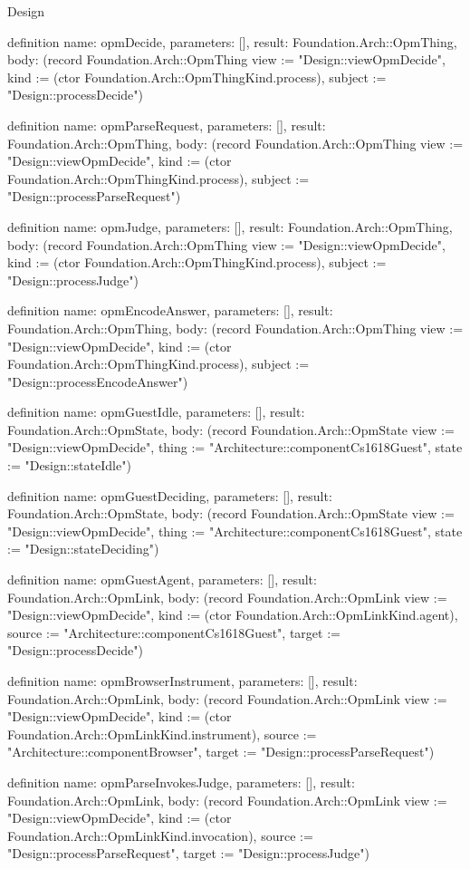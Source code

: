 \begin{lexlean}{Design}
\begin{semanticmodule}
definition{
  name: opmDecide,
  parameters: [],
  result: Foundation.Arch::OpmThing,
  body: (record Foundation.Arch::OpmThing {view := "Design::viewOpmDecide", kind := (ctor Foundation.Arch::OpmThingKind.process), subject := "Design::processDecide"})
}

definition{
  name: opmParseRequest,
  parameters: [],
  result: Foundation.Arch::OpmThing,
  body: (record Foundation.Arch::OpmThing {view := "Design::viewOpmDecide", kind := (ctor Foundation.Arch::OpmThingKind.process), subject := "Design::processParseRequest"})
}

definition{
  name: opmJudge,
  parameters: [],
  result: Foundation.Arch::OpmThing,
  body: (record Foundation.Arch::OpmThing {view := "Design::viewOpmDecide", kind := (ctor Foundation.Arch::OpmThingKind.process), subject := "Design::processJudge"})
}

definition{
  name: opmEncodeAnswer,
  parameters: [],
  result: Foundation.Arch::OpmThing,
  body: (record Foundation.Arch::OpmThing {view := "Design::viewOpmDecide", kind := (ctor Foundation.Arch::OpmThingKind.process), subject := "Design::processEncodeAnswer"})
}

definition{
  name: opmGuestIdle,
  parameters: [],
  result: Foundation.Arch::OpmState,
  body: (record Foundation.Arch::OpmState {view := "Design::viewOpmDecide", thing := "Architecture::componentCs1618Guest", state := "Design::stateIdle"})
}

definition{
  name: opmGuestDeciding,
  parameters: [],
  result: Foundation.Arch::OpmState,
  body: (record Foundation.Arch::OpmState {view := "Design::viewOpmDecide", thing := "Architecture::componentCs1618Guest", state := "Design::stateDeciding"})
}

definition{
  name: opmGuestAgent,
  parameters: [],
  result: Foundation.Arch::OpmLink,
  body: (record Foundation.Arch::OpmLink {view := "Design::viewOpmDecide", kind := (ctor Foundation.Arch::OpmLinkKind.agent), source := "Architecture::componentCs1618Guest", target := "Design::processDecide"})
}

definition{
  name: opmBrowserInstrument,
  parameters: [],
  result: Foundation.Arch::OpmLink,
  body: (record Foundation.Arch::OpmLink {view := "Design::viewOpmDecide", kind := (ctor Foundation.Arch::OpmLinkKind.instrument), source := "Architecture::componentBrowser", target := "Design::processParseRequest"})
}

definition{
  name: opmParseInvokesJudge,
  parameters: [],
  result: Foundation.Arch::OpmLink,
  body: (record Foundation.Arch::OpmLink {view := "Design::viewOpmDecide", kind := (ctor Foundation.Arch::OpmLinkKind.invocation), source := "Design::processParseRequest", target := "Design::processJudge"})
}


\end{semanticmodule}
\end{lexlean}
